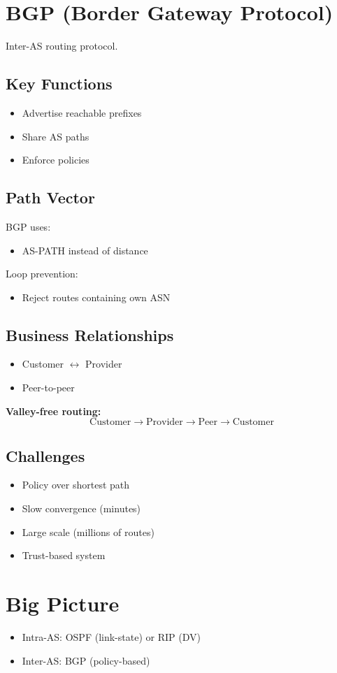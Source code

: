 \documentclass[11pt]{article}
\begin{document}
\section{BGP (Border Gateway Protocol)}
Inter-AS routing protocol.

\subsection{Key Functions}
\begin{itemize}
    \item Advertise reachable prefixes
    \item Share AS paths
    \item Enforce policies
\end{itemize}

\subsection{Path Vector}
BGP uses:
\begin{itemize}
    \item AS-PATH instead of distance
\end{itemize}

Loop prevention:
\begin{itemize}
    \item Reject routes containing own ASN
\end{itemize}

\subsection{Business Relationships}
\begin{itemize}
    \item Customer $\leftrightarrow$ Provider
    \item Peer-to-peer
\end{itemize}

\textbf{Valley-free routing:}
\[
\text{Customer} \rightarrow \text{Provider} \rightarrow \text{Peer} \rightarrow \text{Customer}
\]

\subsection{Challenges}
\begin{itemize}
    \item Policy over shortest path
    \item Slow convergence (minutes)
    \item Large scale (millions of routes)
    \item Trust-based system
\end{itemize}

\section{Big Picture}
\begin{itemize}
    \item Intra-AS: OSPF (link-state) or RIP (DV)
    \item Inter-AS: BGP (policy-based)
\end{itemize}
\end{document}
